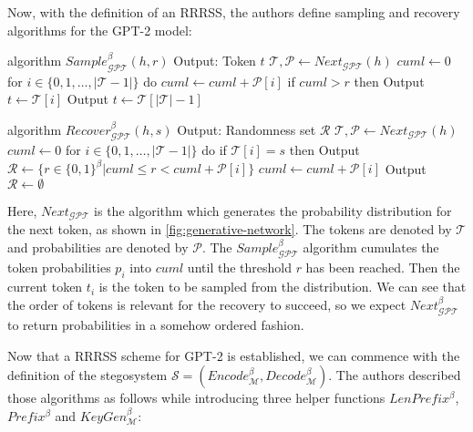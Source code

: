 Now, with the definition of an RRRSS, the authors define sampling and recovery algorithms for the GPT-2 model:

\begin{Pseudocode}[caption={
RRRSS Sample Algorithm for GPT, \cite{Meteor2021}.
Sample produces, given a history $h$ and a value $r$, the next token sampled according to $r$ from the distribution for the next token generated by $Next_{\mathcal{GPT}}$.
}]
algorithm $Sample_{\mathcal{GPT}}^\beta(	h, r)$
	Output: Token $t$
	$\mathcal{T}, \mathcal{P} \leftarrow Next_{\mathcal{GPT}}(h)$
	$cuml \leftarrow 0$
	for $i \in \{ 0, 1, \dots, | \mathcal{T} - 1 | \}$ do
		$cuml \leftarrow cuml + \mathcal{P}[i]$
		if $cuml > r$ then
			Output $t \leftarrow \mathcal{T}[i]$
	Output $t \leftarrow \mathcal{T}[|\mathcal{T}|-1]$
\end{Pseudocode}

\begin{Pseudocode}[caption={
RRRSS Recover Algorithm for GPT, \cite{Meteor2021}.
Given a history $h$ and a sample $s$, return a set of possible random values used to generated $s$ according to $h$
}]
algorithm $Recover_{\mathcal{GPT}}^\beta(h, s)$
	Output: Randomness set $\mathcal{R}$
	$\mathcal{T}, \mathcal{P} \leftarrow Next_{\mathcal{GPT}}(h)$
	$cuml \leftarrow 0$
	for $i \in \{ 0, 1, \dots, | \mathcal{T} - 1 | \}$ do
		if $\mathcal{T}[i] = s$ then
			Output $\mathcal{R} \leftarrow \{ r \in \{ 0, 1\}^\beta | cuml \leq r < cuml + \mathcal{P}[i] \}$
		$cuml \leftarrow cuml + \mathcal{P}[i]$
	Output $\mathcal{R} \leftarrow \emptyset$
\end{Pseudocode}

Here, $Next_{\mathcal{GPT}}$ is the algorithm which generates the probability distribution for the next token, as shown in \autoref{fig:generative-network}.
The tokens are denoted by $\mathcal{T}$ and probabilities are denoted by $\mathcal{P}$.
The $Sample_{\mathcal{GPT}}^\beta$ algorithm cumulates the token probabilities $p_i$ into $cuml$ until the threshold $r$ has been reached.
Then the current token $t_i$ is the token to be sampled from the distribution.
We can see that the order of tokens is relevant for the recovery to succeed, so we expect $Next_{\mathcal{GPT}}^\beta$ to return probabilities in a somehow ordered fashion.

Now that a RRRSS scheme for GPT-2 is established, we can commence with the definition of the stegosystem $\mathcal{S} = \left( Encode_{\mathcal{M}}^\beta, Decode_{\mathcal{M}}^\beta \right)$.
The authors described those algorithms as follows while introducing three helper functions $LenPrefix^\beta$, $Prefix^\beta$ and $KeyGen_{\mathcal{M}}^\beta$:


